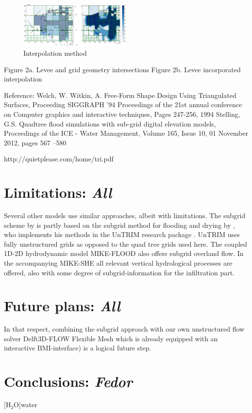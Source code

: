 \documentclass[a4paper]{article}
\begin{document}
\begin{figure}[h]
  \centering
  \includegraphics[width=0.5\textwidth]{interpolationlevees3}
  \caption{Interpolation method}
  \label{fig:interp_a}
\end{figure}

Figure 2a. Levee and grid geometry intersections        Figure 2b. Levee incorporated interpolation

Reference:
Welch, W. Witkin, A. Free-Form Shape Design Using Triangulated Surfaces, Proceeding SIGGRAPH '94 Proceedings of the 21st annual conference on Computer graphics and interactive techniques, Pages 247-256, 1994
Stelling, G.S. Quadtree flood simulations with sub-grid digital elevation models, Proceedings of the ICE - Water Management, Volume 165, Issue 10, 01 November 2012, pages 567 –580

http://quietplease.com/home/tri.pdf

\section{Limitations: \emph{All}}
Several other models use similar approaches, albeit with limitations. The subgrid scheme by \citet{Stelling2012} is partly based on the subgrid method for flooding and drying by \citet{Casulli2009}, who implements his methods in the UnTRIM research package \citet{Casulli2000}. UnTRIM uses fully unstructured grids as opposed to the quad tree grids used here. The coupled 1D-2D hydrodynamic model MIKE-FLOOD \citep{Dhi2014} also offers subgrid overland flow. In the accompanying MIKE-SHE all relevant vertical hydrological processes are offered, also with some degree of subgrid-information for the infiltration part.



\section{Future plans: \emph{All}}
In that respect, combining the subgrid approach with our own unstructured flow solver Delft3D-FLOW Flexible Mesh \citep{Kernkamp2011} which is already equipped with an interactive BMI-interface) is a logical future step.
\section{Conclusions: \emph{Fedor}}







\begin{acronym}[AAAAA]
[$\mathrm{H_2O}$]{water}
\end{acronym}
\end{document}
